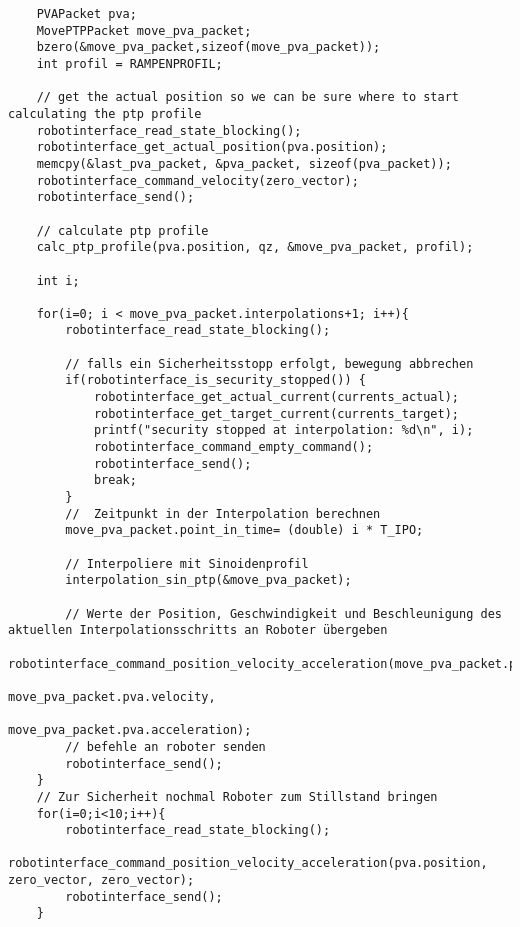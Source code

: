 \documentclass[
a4paper,
12pt,
oneside,
headsepline,		%
footsepline,		%
]{scrbook}
\begin{document}
\begin{lstlisting}
    PVAPacket pva;
    MovePTPPacket move_pva_packet;
    bzero(&move_pva_packet,sizeof(move_pva_packet));
    int profil = RAMPENPROFIL;

    // get the actual position so we can be sure where to start calculating the ptp profile
    robotinterface_read_state_blocking();
    robotinterface_get_actual_position(pva.position);
    memcpy(&last_pva_packet, &pva_packet, sizeof(pva_packet));
    robotinterface_command_velocity(zero_vector);
    robotinterface_send();

    // calculate ptp profile
    calc_ptp_profile(pva.position, qz, &move_pva_packet, profil);

    int i;

    for(i=0; i < move_pva_packet.interpolations+1; i++){
        robotinterface_read_state_blocking();

        // falls ein Sicherheitsstopp erfolgt, bewegung abbrechen
        if(robotinterface_is_security_stopped()) {
            robotinterface_get_actual_current(currents_actual);
            robotinterface_get_target_current(currents_target);
            printf("security stopped at interpolation: %d\n", i);
            robotinterface_command_empty_command();
            robotinterface_send();
            break;
        }
        //  Zeitpunkt in der Interpolation berechnen
        move_pva_packet.point_in_time= (double) i * T_IPO;
        
        // Interpoliere mit Sinoidenprofil
        interpolation_sin_ptp(&move_pva_packet);

        // Werte der Position, Geschwindigkeit und Beschleunigung des aktuellen Interpolationsschritts an Roboter übergeben
        robotinterface_command_position_velocity_acceleration(move_pva_packet.pva.position,
                                                              move_pva_packet.pva.velocity,
                                                              move_pva_packet.pva.acceleration);
        // befehle an roboter senden
        robotinterface_send();
    }
    // Zur Sicherheit nochmal Roboter zum Stillstand bringen
    for(i=0;i<10;i++){
        robotinterface_read_state_blocking();
        robotinterface_command_position_velocity_acceleration(pva.position, zero_vector, zero_vector);
        robotinterface_send();
    }
\end{lstlisting}
\end{document}
